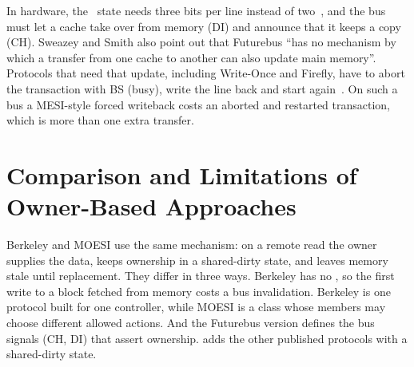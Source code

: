 In hardware, the \stO\ state needs three bits per line instead of
two~\cite[p.~416]{sweazey1986moesi}, and the bus must let a cache take over from
memory (\textsc{DI}) and announce that it keeps a copy (\textsc{CH}). Sweazey and
Smith also point out that Futurebus ``has no mechanism by which a transfer from one
cache to another can also update main memory''. Protocols that need that update,
including Write-Once and Firefly, have to abort the transaction with \textsc{BS}
(busy), write the line back and start again~\cite[p.~418]{sweazey1986moesi}. On
such a bus a MESI-style forced writeback costs an aborted and restarted
transaction, which is more than one extra transfer.

\section{Comparison and Limitations of Owner-Based Approaches}
\label{sec:own-compare}
\label{sec:own-limits}
%

Berkeley and MOESI use the same mechanism: on a remote read the owner supplies the
data, keeps ownership in a shared-dirty state, and leaves memory stale until
replacement. They differ in three ways. Berkeley has no \stE, so the first write
to a block fetched from memory costs a bus invalidation. Berkeley is one protocol
built for one controller, while MOESI is a class whose members may choose
different allowed actions. And the Futurebus version defines the bus signals
(\textsc{CH}, \textsc{DI}) that assert ownership. 
adds the other published protocols with a shared-dirty state.

